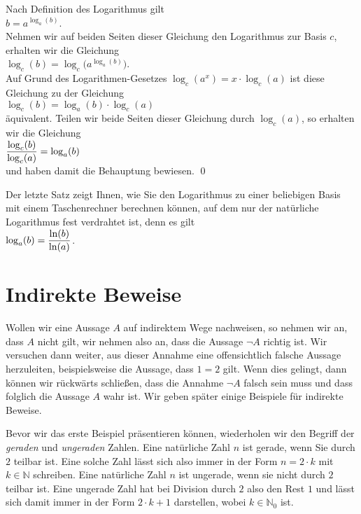\proof
Nach Definition des Logarithmus gilt
\\[0.2cm]
\hspace*{1.3cm}
$b = a^{\log_a(b)}$.
\\[0.2cm]
Nehmen  wir auf beiden Seiten dieser Gleichung den Logarithmus zur Basis $c$, erhalten wir die Gleichung
\\[0.2cm]
\hspace*{1.3cm}
$\log_c(b) = \log_c\bigl(a^{\log_a(b)}\bigr)$.
\\[0.2cm]
Auf Grund des Logarithmen-Gesetzes $\log_c(a^x) = x \cdot \log_c(a)$ ist diese Gleichung zu
der  Gleichung
\\[0.2cm]
\hspace*{1.3cm}
$\log_c(b) = \log_a(b) \cdot \log_c(a)$
\\[0.2cm]
äquivalent.  Teilen wir beide Seiten dieser Gleichung durch $\log_c(a)$, so erhalten wir die Gleichung
\\[0.2cm]
\hspace*{1.3cm}
$\displaystyle\frac{\log_c(b)}{\log_c(a)} = \log_a(b)$
\\[0.2cm]
und haben damit die Behauptung bewiesen.
\qed

\remark
Der letzte Satz zeigt Ihnen, wie Sie den Logarithmus zu einer beliebigen Basis mit einem
Taschenrechner berechnen können, auf dem nur der natürliche Logarithmus fest verdrahtet ist, denn es gilt
\\[0.2cm]
\hspace*{1.3cm}
$\displaystyle\log_a(b) = \frac{\ln(b)}{\ln(a)}$.
\eox


\section{Indirekte Beweise}
Wollen wir eine Aussage $A$ auf indirektem Wege nachweisen, so nehmen wir an, dass $A$
nicht gilt, wir nehmen also an, dass die Aussage $\neg A$ richtig ist.  Wir versuchen dann
weiter, aus dieser Annahme eine offensichtlich falsche Aussage herzuleiten, beispielsweise
die Aussage, dass $1 = 2$ gilt.  Wenn dies gelingt, dann können wir rückwärts schließen,
dass die Annahme $\neg A$ falsch sein muss und dass folglich die Aussage $A$ wahr ist.
Wir geben später einige Beispiele für indirekte Beweise.
\vspace*{0.2cm}

Bevor wir das erste Beispiel präsentieren können, wiederholen wir den Begriff der \emph{geraden} und
\emph{ungeraden} Zahlen.  Eine natürliche Zahl $n$ ist gerade, wenn Sie durch $2$ teilbar ist.  Eine
solche Zahl lässt sich also immer in der Form $n = 2 \cdot k$ mit $k \in \mathbb{N}$ schreiben.
Eine natürliche Zahl $n$  ist ungerade, wenn sie nicht durch $2$ teilbar ist.  Eine ungerade Zahl
hat bei Division durch $2$ also den Rest $1$ und lässt sich damit immer in der Form $2 \cdot k + 1$
darstellen, wobei $k \in \mathbb{N}_0$ ist.

